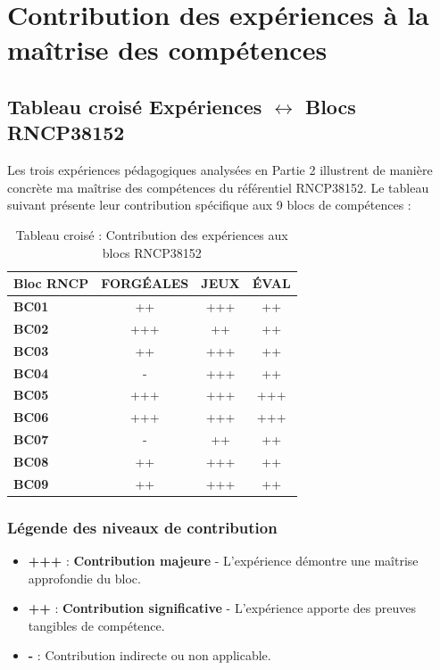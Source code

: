 \chapter{Contribution des expériences à la maîtrise des compétences}

\section{Tableau croisé Expériences $\leftrightarrow$ Blocs RNCP38152}

Les trois expériences pédagogiques analysées en Partie 2 illustrent de manière concrète ma maîtrise des compétences du référentiel RNCP38152. Le tableau suivant présente leur contribution spécifique aux 9 blocs de compétences :

\begin{table}[htbp]
\centering
\begin{tabular}{|l|c|c|c|}
\hline
\textbf{Bloc RNCP} & \textbf{FORGÉALES} & \textbf{JEUX} & \textbf{ÉVAL} \\
\hline
\textbf{BC01} & ++ & +++ & ++ \\
\hline
\textbf{BC02} & +++ & ++ & ++ \\
\hline
\textbf{BC03} & ++ & +++ & ++ \\
\hline
\textbf{BC04} & - & +++ & ++ \\
\hline
\textbf{BC05} & +++ & +++ & +++ \\
\hline
\textbf{BC06} & +++ & +++ & +++ \\
\hline
\textbf{BC07} & - & ++ & ++ \\
\hline
\textbf{BC08} & ++ & +++ & ++ \\
\hline
\textbf{BC09} & ++ & +++ & ++ \\
\hline
\end{tabular}
\caption{Tableau croisé : Contribution des expériences aux blocs RNCP38152}
\end{table}

\subsection{Légende des niveaux de contribution}

\begin{itemize}[leftmargin=*]
    \item \textbf{+++} : \textbf{Contribution majeure} - L'expérience démontre une maîtrise approfondie du bloc.
    \item \textbf{++} : \textbf{Contribution significative} - L'expérience apporte des preuves tangibles de compétence.
    \item \textbf{-} : Contribution indirecte ou non applicable.
\end{itemize}

